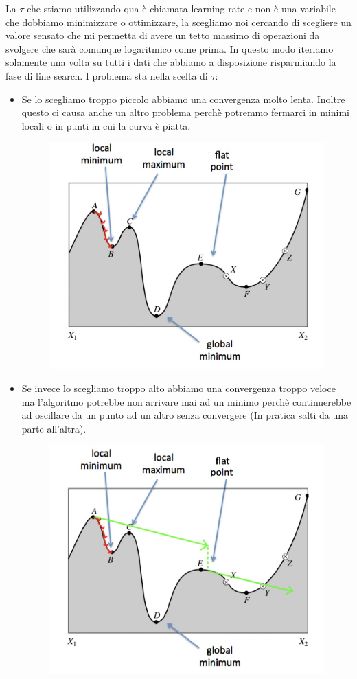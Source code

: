 \documentclass[14pt]{extreport}
\begin{document}
La $\tau$ che stiamo utilizzando qua è chiamata learning rate e non è una variabile che dobbiamo minimizzare o ottimizzare, la scegliamo noi cercando
di scegliere un valore sensato che mi permetta di avere un tetto massimo di operazioni da svolgere che sarà comunque logaritmico come prima. In questo
modo iteriamo solamente una volta su tutti i dati che abbiamo a disposizione risparmiando la fase di line search. I problema sta nella scelta di
$\tau$:
\begin{itemize}
	\item Se lo scegliamo troppo piccolo abbiamo una convergenza molto lenta. Inoltre questo ci causa anche un altro problema perchè potremmo fermarci
	      in minimi locali o in punti in cui la curva è piatta.
	      \begin{figure}[H]
		      \centering
		      \includegraphics[width=0.7\linewidth]{247.jpeg}
	      \end{figure}
	\item Se invece lo scegliamo troppo alto abbiamo una convergenza troppo veloce ma l'algoritmo potrebbe non arrivare mai ad un minimo perchè
	      continuerebbe ad oscillare da un punto ad un altro senza convergere (In pratica salti da una parte all'altra).
	      \begin{figure}[H]
		      \centering
		      \includegraphics[width=0.7\linewidth]{248.jpeg}
	      \end{figure}
\end{itemize}
\end{document}
